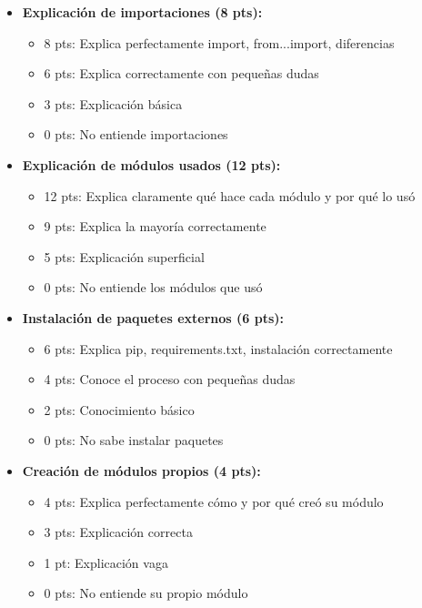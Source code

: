 \documentclass[12pt,a4paper]{article}
\begin{document}
\begin{itemize}[leftmargin=*]
    \item \textbf{Explicación de importaciones (8 pts):}
    \begin{itemize}
        \item 8 pts: Explica perfectamente import, from...import, diferencias
        \item 6 pts: Explica correctamente con pequeñas dudas
        \item 3 pts: Explicación básica
        \item 0 pts: No entiende importaciones
    \end{itemize}
    
    \item \textbf{Explicación de módulos usados (12 pts):}
    \begin{itemize}
        \item 12 pts: Explica claramente qué hace cada módulo y por qué lo usó
        \item 9 pts: Explica la mayoría correctamente
        \item 5 pts: Explicación superficial
        \item 0 pts: No entiende los módulos que usó
    \end{itemize}
    
    \item \textbf{Instalación de paquetes externos (6 pts):}
    \begin{itemize}
        \item 6 pts: Explica pip, requirements.txt, instalación correctamente
        \item 4 pts: Conoce el proceso con pequeñas dudas
        \item 2 pts: Conocimiento básico
        \item 0 pts: No sabe instalar paquetes
    \end{itemize}
    
    \item \textbf{Creación de módulos propios (4 pts):}
    \begin{itemize}
        \item 4 pts: Explica perfectamente cómo y por qué creó su módulo
        \item 3 pts: Explicación correcta
        \item 1 pt: Explicación vaga
        \item 0 pts: No entiende su propio módulo
    \end{itemize}
\end{itemize}
\end{document}
